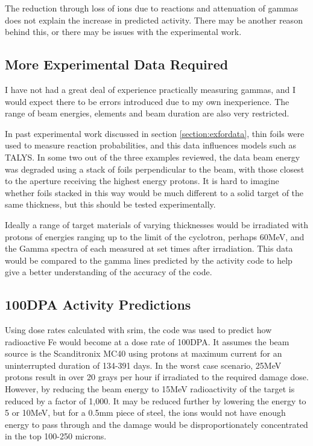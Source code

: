 The reduction through loss of ions due to reactions and attenuation of gammas does not explain the increase in predicted activity.  There may be another reason behind this, or there may be issues with the experimental work.


\subsection{More Experimental Data Required}

I have not had a great deal of experience practically measuring gammas, and I would expect there to be errors introduced due to my own inexperience.  The range of beam energies, elements and beam duration are also very restricted.

In past experimental work discussed in section \ref{section:exfordata}, thin foils were used to measure reaction probabilities, and this data influences models such as TALYS.  In some two out of the three examples reviewed, the data beam energy was degraded using a stack of foils perpendicular to the beam, with those closest to the aperture receiving the highest energy protons.  It is hard to imagine whether foils stacked in this way would be much different to a solid target of the same thickness, but this should be tested experimentally.

Ideally a range of target materials of varying thicknesses would be irradiated with protons of energies ranging up to the limit of the cyclotron, perhaps 60MeV, and the Gamma spectra of each measured at set times after irradiation.  This data would be compared to the gamma lines predicted by the activity code to help give a better understanding of the accuracy of the code.







\subsection{100DPA Activity Predictions}

Using dose rates calculated with \acrshort{srim}, the code was used to predict how radioactive Fe would become at a dose rate of 100DPA.  It assumes the beam source is the Scanditronix MC40 using protons at maximum current for an uninterrupted duration of 134-391 days.  In the worst case scenario, 25MeV protons result in over 20 grays per hour if irradiated to the required damage dose.  However, by reducing the beam energy to 15MeV radioactivity of the target is reduced by a factor of 1,000.  It may be reduced further by lowering the energy to 5 or 10MeV, but for a 0.5mm piece of steel, the ions would not have enough energy to pass through and the damage would be disproportionately concentrated in the top 100-250 microns.

